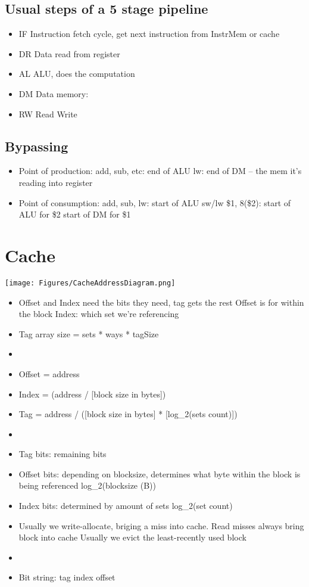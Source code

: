 \documentclass[letterpaper,landscape]{article}
\begin{document}
\begin{multicols}{2}
\subsection*{Usual steps of a 5 stage pipeline}
\begin{itemize}
	\item IF Instruction fetch \- cycle, get next instruction from InstrMem or cache
	\item DR Data read from register
	\item AL ALU, does the computation
	\item DM Data memory: 
	\item RW Read Write
\end{itemize}
\subsection*{Bypassing}
\begin{itemize}
	\item Point of production:
	\subitem add, sub, etc: end of ALU
	\subitem lw: end of DM -- the mem it's reading into register
	\item Point of consumption:
	\subitem add, sub, lw: start of ALU
	\subitem sw/lw \$1, 8(\$2):
	\subsubitem start of ALU for \$2
	\subsubitem start of DM for \$1
\end{itemize}


\section{Cache}
\begin{Figure}
	\centering
	\texttt{[image: Figures/CacheAddressDiagram.png]}
\end{Figure}

\begin{itemize}
	\item Offset and Index need the bits they need, tag gets the rest
	\subitem Offset is for within the block
	\subitem Index: which set we're referencing
	\item Tag array size = sets * ways * tagSize
	\item
	\item Offset = address %
	\item Index = (address / [block size in bytes]) %
	\item Tag = address / ([block size in bytes] * [log_2(sets count)])
	\item
	\item Tag bits: remaining bits
	\item Offset bits: depending on blocksize, determines what byte within the block is being referenced log_2(blocksize (B))
	\item Index bits: determined by amount of sets log_2(set count)
	\item Usually we write-allocate, briging a miss into cache. Read misses always bring block into cache
	\subitem Usually we evict the least-recently used block
	\item
	\item Bit string: tag index offset
\end{itemize}



\end{multicols}
\end{document}
